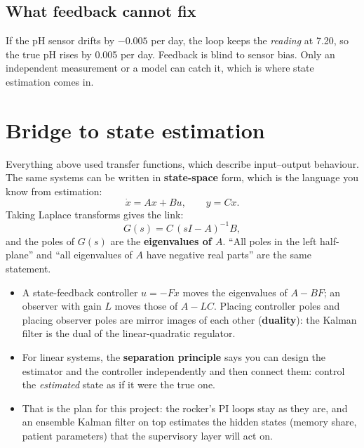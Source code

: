 \documentclass[11pt,a4paper]{article}
\begin{document}
\subsection{What feedback cannot fix}
\begin{careful}[title={The controller controls the measurement, not the truth}]
If the pH sensor drifts by $-0.005$ per day, the loop keeps the \emph{reading} at 7.20, so the true pH
rises by 0.005 per day. Feedback is blind to sensor bias. Only an independent measurement or a model can
catch it, which is where state estimation comes in.
\end{careful}

\section{Bridge to state estimation}
Everything above used transfer functions, which describe input--output behaviour. The same systems can be
written in \textbf{state-space} form, which is the language you know from estimation:
\[
  \dot x = A x + B u, \qquad y = C x .
\]
Taking Laplace transforms gives the link:
\[
  G(s) = C\,(sI - A)^{-1} B ,
\]
and the poles of $G(s)$ are the \textbf{eigenvalues of $A$}. ``All poles in the left half-plane'' and ``all
eigenvalues of $A$ have negative real parts'' are the same statement.
\begin{itemize}
  \item A state-feedback controller $u = -Fx$ moves the eigenvalues of $A - BF$; an observer with gain $L$
    moves those of $A - LC$. Placing controller poles and placing observer poles are mirror images of each
    other (\textbf{duality}): the Kalman filter is the dual of the linear-quadratic regulator.
  \item For linear systems, the \textbf{separation principle} says you can design the estimator and the
    controller independently and then connect them: control the \emph{estimated} state as if it were the
    true one.
  \item That is the plan for this project: the rocker's PI loops stay as they are, and an ensemble Kalman
    filter on top estimates the hidden states (memory share, patient parameters) that the supervisory layer
    will act on.
\end{itemize}

\end{document}
